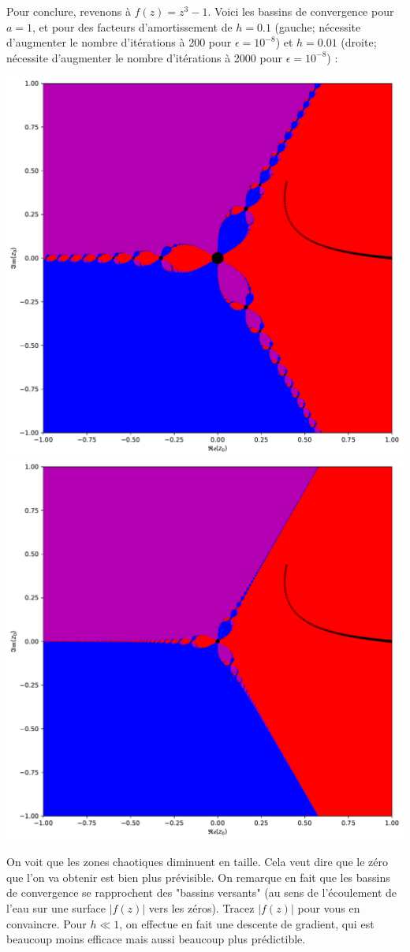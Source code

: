 \documentclass{book}
\begin{document}
\begin{correction}
Pour conclure, revenons à $f(z)=z^3-1$. Voici les bassins de convergence pour $a=1$, et pour des facteurs d'amortissement de $h=0.1$ (gauche; nécessite d'augmenter le nombre d'itérations à 200 pour $\epsilon=10^{-8}$) et $h=0.01$ (droite; nécessite d'augmenter le nombre d'itérations à 2000 pour $\epsilon=10^{-8}$) :
\begin{center}
\includegraphics[width=0.49\linewidth]{TD2/newton_bassins_converg.a1.h01.pdf}
\includegraphics[width=0.49\linewidth]{TD2/newton_bassins_converg.a1.h001.pdf}
\end{center}
On voit que les zones chaotiques diminuent en taille. Cela veut dire que le zéro que l'on va obtenir est bien plus prévisible. On remarque en fait que les bassins de convergence se rapprochent des "bassins versants" (au sens de l'écoulement de l'eau sur une surface $|f(z)|$ vers les zéros). Tracez $|f(z)|$ pour vous en convaincre. Pour $h \ll 1$, on effectue en fait une descente de gradient, qui est beaucoup moins efficace mais aussi beaucoup plus prédictible.
\end{correction}
\end{document}
